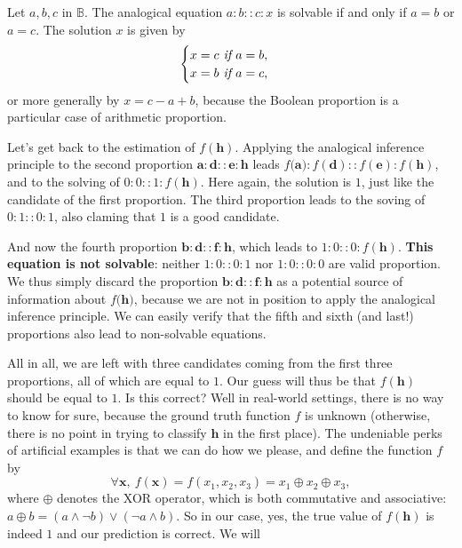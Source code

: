 \begin{proposition}
  Let $a, b, c$ in $\mathbb{B}$. The analogical equation
  $a :b::c:x$
  is solvable if and only if $a = b$ or $a = c$. The solution $x$ is given by
  $$
  \begin{cases}
    x = c \emph{ if } a = b,\\
    x = b \emph{ if } a = c,
  \end{cases}
  $$
  or more generally by $x = c - a + b$, because the Boolean proportion is a
  particular case of arithmetic proportion.
\end{proposition}

Let's get back to the estimation of $f(\mathbf{h})$. Applying the analogical
inference principle to the second proportion $\mathbf{a} : \mathbf{d} ::
\mathbf{e} : \mathbf{h}$ leads $f(\mathbf{a)} : f(\mathbf{d}) :: f(\mathbf{e})
: f(\mathbf{h})$, and to the solving of $0:0::1:f(\mathbf{h})$. Here again, the
solution is $1$, just like the candidate of the first proportion.
The third proportion leads to the soving of $0:1::0:1$, also claming that $1$
is a good candidate.

And now the fourth proportion $\mathbf{b} : \mathbf{d} :: \mathbf{f} :
\mathbf{h}$, which leads to $1:0::0:f(\mathbf{h})$. \textbf{This equation is not
solvable}: neither $1:0::0:1$ nor $1:0::0:0$ are valid proportion. We thus
simply discard the proportion $\mathbf{b} : \mathbf{d} :: \mathbf{f} :
\mathbf{h}$ as a potential source of information about $f(\mathbf{h)}$, because
we are not in position to apply the analogical inference principle. We can
easily verify that the fifth and sixth (and last!) proportions also lead to
non-solvable equations.

All in all, we are left with three candidates coming from the first three
proportions, all of which are equal to $1$. Our guess will thus be that
$f(\mathbf{h})$ should be equal to $1$. Is this correct? Well in real-world
settings, there is no way to know for sure, because the ground truth function
$f$ is unknown (otherwise, there is no point in trying to classify $\mathbf{h}$
in the first place). The undeniable perks of artificial examples is that we can
do how we please, and define the function $f$ by
$$\forall \mathbf{x}, ~ f(\mathbf{x}) = f(x_1, x_2, x_3) = x_1 \oplus x_2 \oplus x_3,$$
where $\oplus$ denotes the XOR operator, which is both commutative and
associative: $a \oplus b = (a \wedge \neg b) \vee (\neg a \wedge b)$. So in our
case, yes, the true value of $f(\mathbf{h})$ is indeed $1$ and our prediction
is correct. We will

